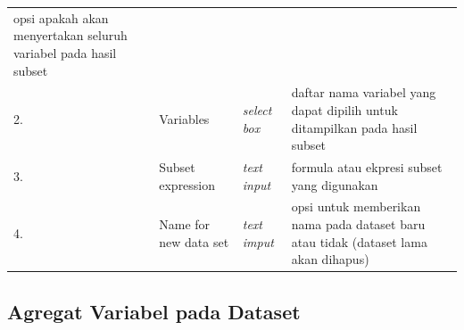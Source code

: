 \documentclass[12pt,]{krantz}
\begin{document}
\begin{longtable}[]{@{}llll@{}}
\begin{minipage}[t]{0.61\columnwidth}
opsi apakah akan menyertakan seluruh variabel pada hasil subset\strut
\end{minipage}\tabularnewline
\begin{minipage}[t]{0.04\columnwidth}\raggedright
2.\strut
\end{minipage} & \begin{minipage}[t]{0.14\columnwidth}\raggedright
Variables\strut
\end{minipage} & \begin{minipage}[t]{0.09\columnwidth}\raggedright
\emph{select box}\strut
\end{minipage} & \begin{minipage}[t]{0.61\columnwidth}\raggedright
daftar nama variabel yang dapat dipilih untuk ditampilkan pada hasil subset\strut
\end{minipage}\tabularnewline
\begin{minipage}[t]{0.04\columnwidth}\raggedright
3.\strut
\end{minipage} & \begin{minipage}[t]{0.14\columnwidth}\raggedright
Subset expression\strut
\end{minipage} & \begin{minipage}[t]{0.09\columnwidth}\raggedright
\emph{text input}\strut
\end{minipage} & \begin{minipage}[t]{0.61\columnwidth}\raggedright
formula atau ekpresi subset yang digunakan\strut
\end{minipage}\tabularnewline
\begin{minipage}[t]{0.04\columnwidth}\raggedright
4.\strut
\end{minipage} & \begin{minipage}[t]{0.14\columnwidth}\raggedright
Name for new data set\strut
\end{minipage} & \begin{minipage}[t]{0.09\columnwidth}\raggedright
\emph{text imput}\strut
\end{minipage} & \begin{minipage}[t]{0.61\columnwidth}\raggedright
opsi untuk memberikan nama pada dataset baru atau tidak (dataset lama akan dihapus)\strut
\end{minipage}\tabularnewline
\bottomrule
\end{longtable}

\hypertarget{agregat-variabel-pada-dataset}{%
\subsection{Agregat Variabel pada Dataset}\label{agregat-variabel-pada-dataset}}
\end{document}
